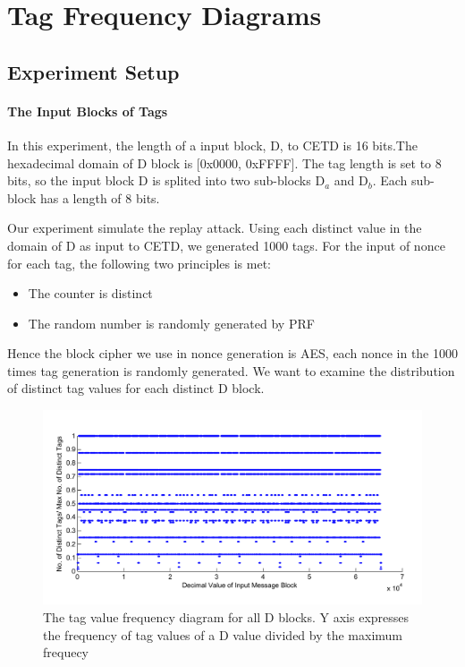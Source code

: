 \documentclass{article}
\begin{document}
\section{Tag Frequency Diagrams}
\subsection{Experiment Setup}
\paragraph{The Input Blocks of Tags}
In this experiment, the length of a input block, D, to CETD is 16 bits.The hexadecimal domain of D block is [0x0000, 0xFFFF].  The tag length is set to 8 bits, so the input block D is splited into two sub-blocks D$_a$ and D$_b$. Each sub-block has a length of 8 bits.

Our experiment simulate the replay attack. Using each distinct value in the domain of D as input to CETD, we generated 1000 tags. For the input of nonce for each tag, the following two principles is met:
\begin{itemize}
	\item The counter is distinct
	\item The random number is randomly generated by PRF
\end{itemize}
Hence the block cipher we use in nonce generation is AES, each nonce in the 1000 times tag generation is randomly generated. 
We want to examine the distribution of distinct tag values for each distinct D block. 
\begin{figure}[htbp]
 \centering
 \includegraphics[scale=0.4]{./frequency/overall_frequency_spot.pdf}
 \caption{The tag value frequency diagram for all D blocks. Y axis expresses the frequency of tag values of a D value divided by the maximum frequecy}
 \label{fig:1 }
\end{figure} 
\end{document}
